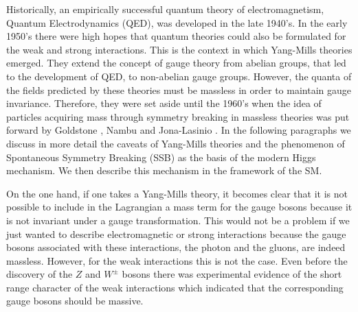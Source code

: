 
Historically, an empirically successful quantum theory of electromagnetism, Quantum Electrodynamics (QED), was developed in the late 1940's. In the early 1950's there were high hopes that quantum theories could also be formulated for the weak and strong interactions. This is the context in which Yang-Mills theories emerged. They extend the concept of gauge theory from abelian groups, that led to the development of QED, to non-abelian gauge groups. However, the quanta of the fields predicted by these theories must be massless in order to maintain gauge invariance. Therefore, they were set aside until the 1960's when the idea of particles acquiring mass through symmetry breaking in massless theories was put forward by Goldstone \cite{Goldstone}, Nambu and Jona-Lasinio \cite{Nambu-Jona-Lasinio}. In the following paragraphs we discuss in more detail the caveats of Yang-Mills theories and the phenomenon of Spontaneous Symmetry Breaking (SSB) as the basis of the modern Higgs mechanism. We then describe this mechanism in the framework of the SM.   

On the one hand, if one takes a Yang-Mills theory, it becomes clear that it is not possible to include in the Lagrangian a mass term for the gauge bosons because it is not invariant under a gauge transformation. This would not be a problem if we just wanted to describe electromagnetic or strong interactions because the gauge bosons associated with these interactions, the photon and the gluons, are indeed massless. However, for the weak interactions this is not the case. Even before the discovery of the $Z$ and $W^{\pm}$ bosons \cite{Zdiscovery,Wdiscovery} there was experimental evidence of the short range character of the weak interactions which indicated that the corresponding gauge bosons should be massive. 

